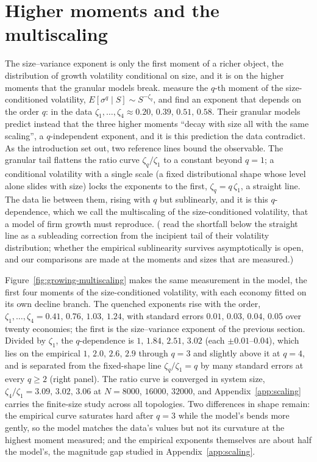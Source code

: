 \section{Higher moments and the multiscaling}
\label{sec:growing-multiscaling}

The size--variance exponent is only the first moment of a richer object, the distribution
of growth volatility conditional on size, and it is on the higher moments that the
granular models break. \citet{moran2024} measure the $q$-th moment of the
size-conditioned volatility, $E[\sigma^q \mid S] \sim S^{-\zeta_q}$, and find an exponent
that depends on the order $q$: in the data
$\zeta_1,\dots,\zeta_4 \approx 0.20,\,0.39,\,0.51,\,0.58$. Their granular models predict
instead that the three higher moments ``decay with size all with the same scaling'', a
$q$-independent exponent, and it is this prediction the data contradict. As the
introduction set out, two reference lines bound the observable. The granular tail flattens
the ratio curve $\zeta_q/\zeta_1$ to a constant beyond $q=1$; a conditional volatility
with a single scale (a fixed distributional shape whose level alone slides with size)
locks the exponents to the first, $\zeta_q = q\,\zeta_1$, a straight line. The data lie
between them, rising with $q$ but sublinearly, and it is this $q$-dependence, which we
call the multiscaling of the size-conditioned volatility, that a model of firm growth must
reproduce. (\citet{moran2024} read the shortfall below the straight line as a subleading
correction from the incipient tail of their volatility distribution; whether the empirical
sublinearity survives asymptotically is open, and our comparisons are made at the moments
and sizes that are measured.)

Figure~\ref{fig:growing-multiscaling} makes the same measurement in the model, the
first four moments of the size-conditioned volatility, with each economy fitted on
its own decline branch. The quenched exponents rise with the order,
$\zeta_1,\dots,\zeta_4 = 0.41,\,0.76,\,1.03,\,1.24$, with standard errors
$0.01,\,0.03,\,0.04,\,0.05$ over twenty economies; the first is the size--variance
exponent of the previous section. Divided by $\zeta_1$, the
$q$-dependence is $1,\,1.84,\,2.51,\,3.02$ (each $\pm 0.01$--$0.04$), which lies on the
empirical $1,\,2.0,\,2.6,\,2.9$ through $q = 3$ and slightly above it at $q = 4$, and is
separated from the fixed-shape line $\zeta_q/\zeta_1 = q$ by many standard errors at
every $q \ge 2$ (right panel). The ratio curve is converged in system size,
$\zeta_4/\zeta_1 = 3.09,\,3.02,\,3.06$ at $N = 8000$, $16000$, $32000$, and
Appendix~\ref{app:scaling} carries the finite-size study across all topologies. Two
differences in shape remain: the
empirical curve saturates hard after $q = 3$ while the model's bends more gently, so the
model matches the data's values but not its curvature at the highest moment measured;
and the empirical exponents themselves are about half the model's, the magnitude gap
studied in Appendix~\ref{app:scaling}.

